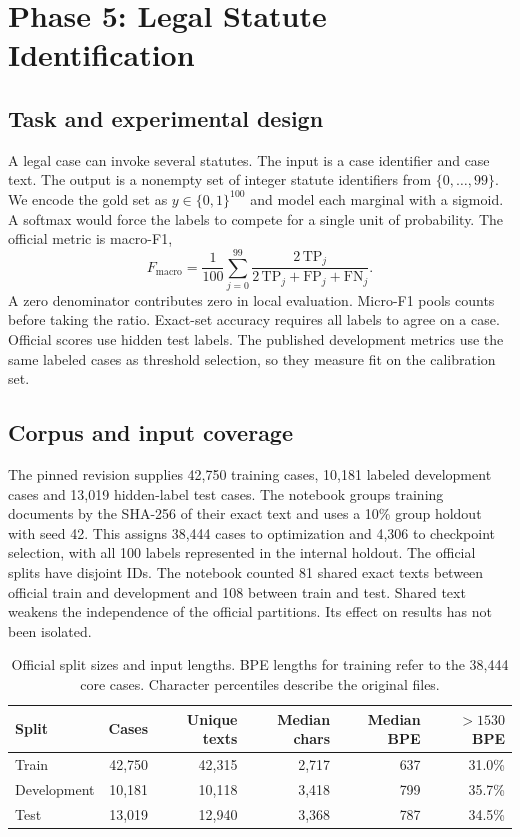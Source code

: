 \clearpage
\section{Phase 5: Legal Statute Identification}
\label{sec:phase5}

\subsection{Task and experimental design}
A legal case can invoke several statutes. The input is a case identifier and
case text. The output is a nonempty set of integer statute identifiers from
\(\{0,\ldots,99\}\). We encode the gold set as
\(y\in\{0,1\}^{100}\) and model each marginal with a sigmoid. A softmax would
force the labels to compete for a single unit of probability. The official
metric is macro-F1,
\[
 F_{\mathrm{macro}}=\frac{1}{100}\sum_{j=0}^{99}
 \frac{2\,\mathrm{TP}_j}{2\,\mathrm{TP}_j+\mathrm{FP}_j+\mathrm{FN}_j}.
\]
A zero denominator contributes zero in local evaluation. Micro-F1 pools
counts before taking the ratio. Exact-set accuracy requires all labels to
agree on a case. Official scores use hidden test labels. The published
development metrics use the same labeled cases as threshold selection, so
they measure fit on the calibration set.

\subsection{Corpus and input coverage}
The pinned  revision supplies 42,750 training cases, 10,181
labeled development cases and 13,019 hidden-label test cases. The notebook
groups training documents by the SHA-256 of their exact text and uses a
10\% group holdout with seed 42. This assigns 38,444 cases to optimization
and 4,306 to checkpoint selection, with all 100 labels represented in the
internal holdout. The official splits have disjoint IDs. The notebook
counted 81 shared exact texts between official train and development and 108
between train and test. Shared text weakens the independence of the
official partitions. Its effect on results has not been isolated.

\begin{table}[htbp]
\centering\small
\caption{Official split sizes and input lengths. BPE lengths for training
refer to the 38,444 core cases. Character percentiles describe the original files.}
\label{tab:p5-corpus}
\begin{tabular}{lrrrrr}
\toprule
Split & Cases & Unique texts & Median chars & Median BPE & \(>1530\) BPE \\
\midrule
Train & 42,750 & 42,315 & 2,717 & 637 & 31.0\% \\
Development & 10,181 & 10,118 & 3,418 & 799 & 35.7\% \\
Test & 13,019 & 12,940 & 3,368 & 787 & 34.5\% \\
\bottomrule
\end{tabular}
\end{table}

